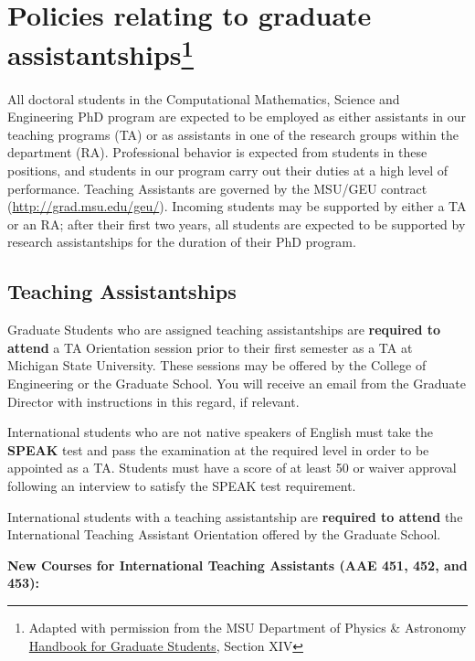 \section[Policies relating to graduate assistantships]{Policies
relating to graduate assistantships\footnote{Adapted with permission
from the MSU Department of Physics \& Astronomy
\href{https://www.pa.msu.edu/grad/GradHandbook_Aug2015.pdf}{Handbook
for Graduate Students}, Section XIV}}

All doctoral students in the Computational
Mathematics, Science and Engineering PhD program are expected to be
employed as either assistants in our teaching programs (TA) or as
assistants in one of the research groups within the department (RA).
Professional behavior is expected from students in these positions, and
students in our program carry out their duties at a high level of
performance.  Teaching Assistants are governed by the MSU/GEU contract
(\url{http://grad.msu.edu/geu/}).  Incoming students may be supported
by either a TA or an RA; after their first two years, all students are
expected to be supported by research assistantships for the duration
of their PhD program.

\subsection{Teaching Assistantships}

Graduate Students who are assigned teaching assistantships are
\textbf{required to attend} a TA Orientation session prior to their first
semester as a TA at Michigan State University.  These sessions may be
offered by the College of Engineering or the Graduate School.  You
will receive an email from the Graduate Director with instructions in
this regard, if relevant.

International students who are not native speakers of English must
take the \textbf{SPEAK} test and pass the examination at the required
level in order to be appointed as a TA.  Students must have a score of
at least 50 or waiver approval following an interview to satisfy the
SPEAK test requirement.

International students with a teaching assistantship are
\textbf{required to attend} the International Teaching Assistant
Orientation offered by the Graduate School.


\vspace{5mm}
\noindent
\textbf{New Courses for International Teaching Assistants (AAE 451, 452, and
453):}

